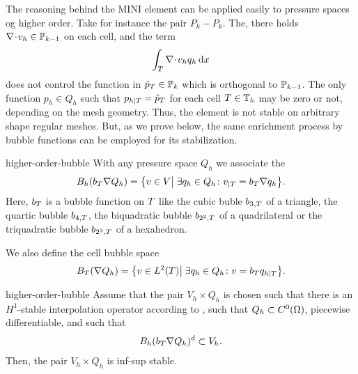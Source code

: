 \begin{intro}
  The reasoning behind the MINI element can be applied easily to
  pressure spaces og higher order. Take for instance the pair
  $P_k-P_k$. The, there holds $\div v_h \in \P_{k-1}$ on each cell,
  and the term
  \begin{gather*}
    \int_\cell \div v_h q_h\dx
  \end{gather*}
  does not control the function in $\hat p_\cell \in \P_k$ which is
  orthogonal to $\P_{k-1}$. The only function $p_h\in Q_h$ such that
  $p_{h|\cell} = \hat p_\cell$ for each cell $\cell\in\mesh_h$ may be
  zero or not, depending on the mesh geometry. Thus, the element is
  not stable on arbitrary shape regular meshes. But, as we prove
  below, the same enrichment process by bubble functions can be
  employed for its stabilization.
\end{intro}

\begin{Definition}{higher-order-bubble}
  With any pressure space $Q_h$ we associate the 
  \begin{gather}
    \label{eq:stokes:24}
    B_h(b_\cell \nabla Q_h)
    = \bigl\{ v\in V \big\vert
    \; \exists q_h\in Q_h \colon v_{|\cell} = b_\cell \nabla q_h \bigr\}.
  \end{gather}
  Here, $b_\cell$ is a bubble function on $\cell$ like the cubic buble
  $b_{3,\cell}$ of a triangle, the quartic bubble $b_{4,\cell}$, the
  biquadratic bubble $b_{2^2,\cell}$ of a quadrilateral or the
  triquadratic bubble $b_{2^3,\cell}$ of a hexahedron.
  
  We also define the cell bubble space
  \begin{gather}
    \label{eq:stokes:25}
    B_\cell(\nabla Q_h) = \bigl\{ v\in L^2(\cell) \big\vert
    \;\exists q_h\in Q_h \colon v = b_T q_{h|\cell}\bigr\}.
  \end{gather}
\end{Definition}

\begin{Theorem}{higher-order-bubble}
  Assume that the pair $V_h\times Q_h$ is chosen such that there is
  an $H^1$-stable interpolation operator according to
  , such that $Q_h\subset
  C^0(\domain)$, piecewise differentiable, and such that
  \begin{gather}
    B_h(b_\cell \nabla Q_h)^d \subset V_h.
  \end{gather}
  Then, the pair $V_h\times Q_h$ is inf-sup stable.
\end{Theorem}

